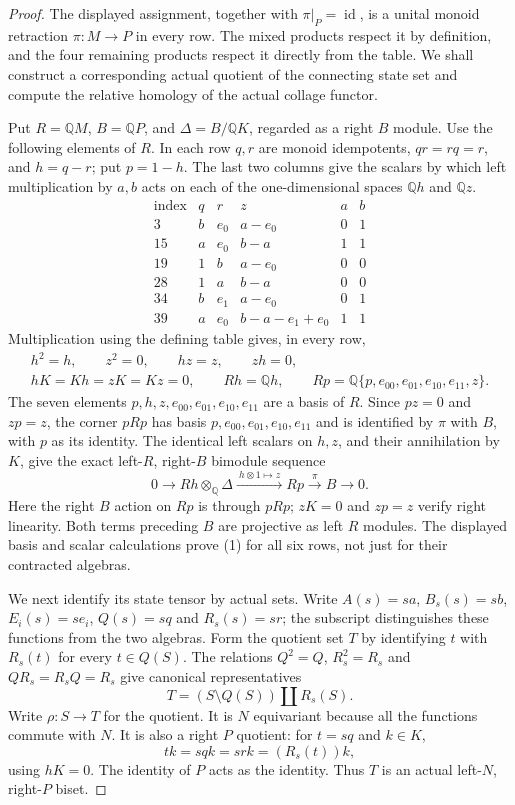 \begin{proof}
The displayed assignment, together with $\pi|_P=\operatorname{id}$,
is a unital monoid retraction $\pi:M\to P$ in every row.
The mixed products respect it by definition, and the four
remaining products respect it directly from the table.
We shall construct a corresponding actual quotient of the
connecting state set and compute the relative homology of
the actual collage functor.

Put $R=\mathbb QM$, $B=\mathbb QP$, and
$\Delta=B/\mathbb QK$, regarded as a right $B$ module.
Use the following elements of $R$.  In each row $q,r$ are
monoid idempotents, $qr=rq=r$, and $h=q-r$; put $p=1-h$.
The last two columns give the scalars by which left
multiplication by $a,b$ acts on each of the one-dimensional
spaces $\mathbb Qh$ and $\mathbb Qz$.
\[
\begin{array}{c|cc|c|cc}
\text{index}&q&r&z&a&b\\\hline
3&b&e_0&a-e_0&0&1\\
15&a&e_0&b-a&1&1\\
19&1&b&a-e_0&0&0\\
28&1&a&b-a&0&0\\
34&b&e_1&a-e_0&0&1\\
39&a&e_0&b-a-e_1+e_0&1&1
\end{array}
\]
Multiplication using the defining table gives, in every row,
\[
\begin{gathered}
 h^2=h,\qquad z^2=0,\qquad hz=z,\qquad zh=0,\\
 hK=Kh=zK=Kz=0,\qquad
 Rh=\mathbb Qh,\qquad
 Rp=\mathbb Q\{p,e_{00},e_{01},e_{10},e_{11},z\}.
\end{gathered}
\]
The seven elements $p,h,z,e_{00},e_{01},e_{10},e_{11}$
are a basis of $R$.  Since $pz=0$ and $zp=z$, the corner
$pRp$ has basis $p,e_{00},e_{01},e_{10},e_{11}$ and is
identified by $\pi$ with $B$, with $p$ as its identity.
The identical left scalars on $h,z$, and their annihilation
by $K$, give the exact left-$R$, right-$B$ bimodule sequence
\[
 0\longrightarrow Rh\otimes_{\mathbb Q}\Delta
 \xrightarrow{\ h\otimes1\mapsto z\ }Rp
 \xrightarrow{\pi}B\longrightarrow0.                 \tag{1}
\]
Here the right $B$ action on $Rp$ is through $pRp$;
$zK=0$ and $zp=z$ verify right linearity.  Both terms
preceding $B$ are projective as left $R$ modules.
The displayed basis and scalar calculations prove (1)
for all six rows, not just for their contracted algebras.

We next identify its state tensor by actual sets.  Write
$A(s)=sa$, $B_s(s)=sb$, $E_i(s)=se_i$, $Q(s)=sq$ and
$R_s(s)=sr$; the subscript distinguishes these functions
from the two algebras.  Form the quotient set $T$ by
identifying $t$ with $R_s(t)$ for every $t\in Q(S)$.
The relations $Q^2=Q$, $R_s^2=R_s$ and
$QR_s=R_sQ=R_s$ give canonical representatives
\[
 T=(S\setminus Q(S))\amalg R_s(S).
\]
Write $\rho:S\to T$ for the quotient.  It is $N$
equivariant because all the functions commute with $N$.
It is also a right $P$ quotient: for $t=sq$ and $k\in K$,
\[
 tk=sqk=srk=(R_s(t))k,
\]
using $hK=0$.  The identity of $P$ acts as the identity.
Thus $T$ is an actual left-$N$, right-$P$ biset.


\end{proof}
